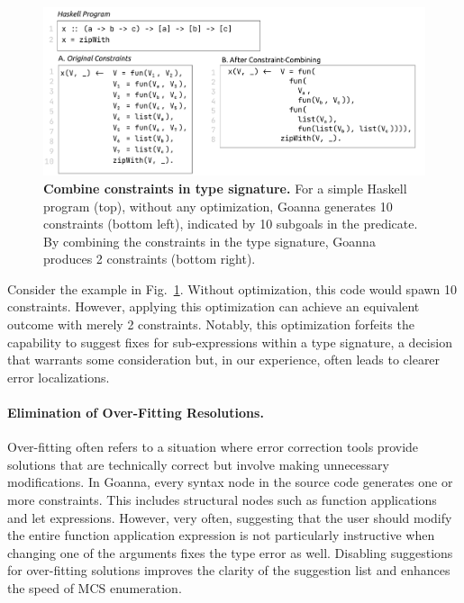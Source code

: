 \documentclass[pdflatex,sn-mathphys-num]{sn-jnl}%
\begin{document}
   \begin{figure}[ht!]
        \centering
        \includegraphics[width=\linewidth]{images/Combine-Constraints}
        \caption[Combine constraints in type signature]{\textbf{Combine constraints in type signature.} For a simple Haskell program (top),  without any optimization, Goanna generates 10 constraints (bottom left), indicated by 10 subgoals in the predicate. By combining the constraints in the type signature, Goanna produces 2 constraints (bottom right).}
        \label{fig:combine-constraints}
    \end{figure}

    Consider the example in Fig.~\ref{fig:combine-constraints}. Without optimization, this code would spawn 10 constraints. However, applying this optimization can achieve an equivalent outcome with merely 2 constraints. Notably, this optimization forfeits the capability to suggest fixes for sub-expressions within a type signature, a decision that warrants some consideration but, in our experience, often leads to clearer error localizations.

    \paragraph{Elimination of Over-Fitting Resolutions.}
    Over-fitting often refers to a situation where error correction tools provide solutions that are technically correct but involve making unnecessary modifications. In Goanna, every syntax node in the source code generates one or more constraints. This includes structural nodes such as function applications and let expressions. However, very often, suggesting that the user should modify the entire function application expression is not particularly instructive when changing one of the arguments fixes the type error as well. Disabling suggestions for over-fitting solutions improves the clarity of the suggestion list and enhances the speed of MCS enumeration.
   
\end{document}
